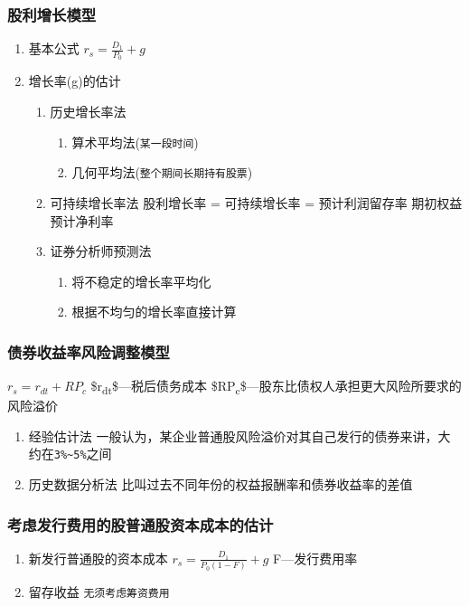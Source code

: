 \documentclass[11pt]{article}
\begin{document}
\subsubsection{股利增长模型}
\label{sec:orgbeee9aa}
\begin{enumerate}
\item 基本公式
\label{sec:org4aceae4}
\(r_{s}=\frac{D_{1}}{P_{0}}+g\)
\item 增长率(g)的估计
\label{sec:org24e015d}
\begin{enumerate}
\item 历史增长率法
\label{sec:org14c82cb}
\begin{enumerate}
\item 算术平均法(\texttt{某一段时间})
\item 几何平均法(\texttt{整个期间长期持有股票})
\end{enumerate}
\item 可持续增长率法
\label{sec:orgdf7b446}
股利增长率 = 可持续增长率 = 预计利润留存率 \texttimes{} 期初权益预计净利率
\item 证券分析师预测法
\label{sec:org1cbe3c9}
\begin{enumerate}
\item 将不稳定的增长率平均化
\item 根据不均匀的增长率直接计算
\end{enumerate}
\end{enumerate}
\end{enumerate}
\subsubsection{债券收益率风险调整模型}
\label{sec:org7861ae4}
\(r_{s}=r_{dt} + RP_{c}\)
\$r\textsubscript{dt}\$---税后债务成本
\$RP\textsubscript{c}\$---股东比债权人承担更大风险所要求的风险溢价
\begin{enumerate}
\item 经验估计法
\label{sec:orgce1d317}
一般认为，某企业普通股风险溢价对其自己发行的债券来讲，大约在\texttt{3\%\textasciitilde{}5\%}之间
\item 历史数据分析法
\label{sec:org828fae6}
比叫过去不同年份的权益报酬率和债券收益率的差值
\end{enumerate}
\subsubsection{考虑发行费用的股普通股资本成本的估计}
\label{sec:org1c5eee8}
\begin{enumerate}
\item 新发行普通股的资本成本
\label{sec:orgaa59e35}
\(r_{s}=\frac{D_{1}}{P_{0}(1-F)}+g\)
F---发行费用率
\item 留存收益
\label{sec:orgb7ad1e2}
\texttt{无须考虑筹资费用}
\end{enumerate}
\end{document}
